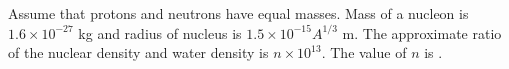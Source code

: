 \item Assume that protons and neutrons have equal masses. Mass of a nucleon is \(1.6 \times 10^{-27}\) kg and radius of nucleus is \(1.5 \times 10^{-15} A^{1/3}\) m. The approximate ratio of the nuclear density and water density is \(n \times 10^{13}\). The value of \(n\) is \underline{\hspace{2.5cm}}.
    \begin{center}
    \end{center}